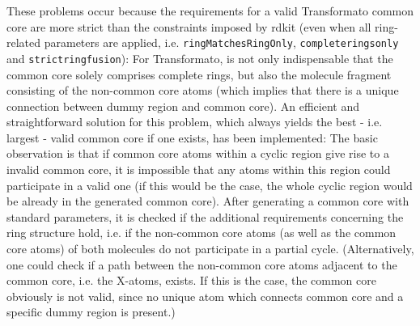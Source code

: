 These problems occur because the requirements for a valid Transformato common core are more strict than the constraints imposed by rdkit  (even when all ring-related parameters are applied, i.e. \texttt{ringMatchesRingOnly}, \texttt{completeringsonly} and \texttt{strictringfusion}): For Transformato, is not only indispensable that the common core solely comprises complete rings, but also the molecule fragment consisting of the non-common core atoms (which implies that there is a unique connection between dummy region and common core).
An efficient and straightforward solution for this problem, which always yields the best - i.e. largest - valid common core if one exists, has been implemented:
The basic observation is that if common core atoms within a cyclic region give rise to a invalid common core, it is impossible that any atoms within this region could participate in a valid one (if this would be the case, the whole cyclic region would be already in the generated common core).
After generating a common core with standard parameters, it is checked if the additional requirements concerning the ring structure hold, i.e. if the non-common core atoms (as well as the common core atoms) of both molecules do not participate in a partial cycle.
(Alternatively, one could check if a path between the non-common core atoms adjacent to the common core, i.e. the X-atoms, exists. If this is the case, the common core obviously is not valid, since no unique atom which connects common core and a specific dummy region is present.)





